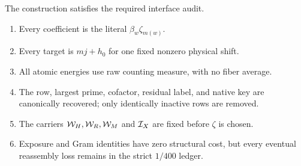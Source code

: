 The construction satisfies the required interface audit.
\begin{enumerate}[leftmargin=2.3em]
 \item Every coefficient is the literal \(\beta_w\zeta_{m(w)}\).
 \item Every target is \(mj+h_0\) for one fixed nonzero physical shift.
 \item All atomic energies use raw counting measure, with no fiber average.
 \item The row, largest prime, cofactor, residual label, and native key are
       canonically recovered; only identically inactive rows are removed.
 \item The carriers \(\mathcal W_H,\mathcal W_R,\mathcal W_M\) and \(\mathcal I_X\) are fixed before
       \(\zeta\) is chosen.
 \item Exposure and Gram identities have zero structural cost, but every
       eventual reassembly loss remains in the strict \(1/400\) ledger.
\end{enumerate}
